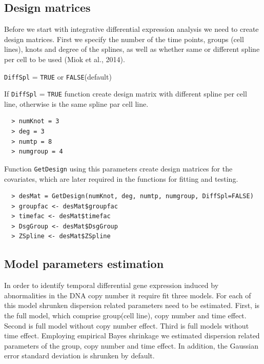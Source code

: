 \documentclass[a4paper]{article}
\begin{document}
\subsection{Design matrices}
Before we start with integrative differential expression analysis we need to create design matrices. First we specify the number of the time points, groups (cell lines), knots and degree of the splines, as well as whether same or different spline per cell to be used (Miok et al., 2014).
\begin{compactitem}
\item {\tt DiffSpl} = {\tt TRUE} or {\tt FALSE}(default) \\
\end{compactitem}
If {\tt DiffSpl} = {\tt TRUE} function create design matrix with different spline per cell line, otherwise is the same spline par cell line.

\begin{verbatim}
  > numKnot = 3    
  > deg = 3         
  > numtp = 8      
  > numgroup = 4  
\end{verbatim}

  Function {\tt GetDesign} using this parameters create design matrices for the covariates, which are later required in the functions for fitting and testing.
\begin{verbatim}
  > desMat = GetDesign(numKnot, deg, numtp, numgroup, DiffSpl=FALSE)
  > groupfac <- desMat$groupfac
  > timefac <- desMat$timefac
  > DsgGroup <- desMat$DsgGroup
  > ZSpline <- desMat$ZSpline
\end{verbatim}

\subsection{Model parameters estimation}

In order to identify temporal differential gene expression induced by abnormalities in the DNA copy number it require fit three models. For each of this model shrunken dispersion related parameters need to be estimated. First, is the full model, which comprise group(cell line), copy number and time effect. Second is full model without copy number effect. Third is full models without time effect. Employing empirical Bayes shrinkage we estimated dispersion related parameters of the group, copy number and time effect. In addition, the Gaussian error standard deviation is shrunken by default. 
\end{document}
